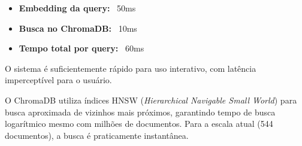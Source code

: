 \begin{itemize}
    \item \textbf{Embedding da query:} ~50ms
    \item \textbf{Busca no ChromaDB:} ~10ms
    \item \textbf{Tempo total por query:} ~60ms
\end{itemize}

O sistema é suficientemente rápido para uso interativo, com latência imperceptível para o usuário.

\begin{infobox}[Escalabilidade]
O ChromaDB utiliza índices HNSW (\textit{Hierarchical Navigable Small World}) para busca aproximada de vizinhos mais próximos, garantindo tempo de busca logarítmico mesmo com milhões de documentos. Para a escala atual (544 documentos), a busca é praticamente instantânea.
\end{infobox}

